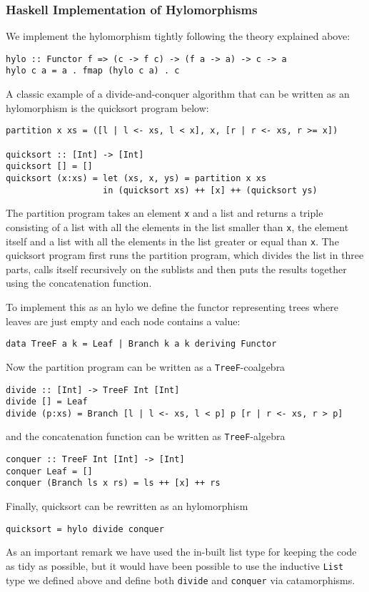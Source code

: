 \documentclass{llncs}
\begin{document}
\subsubsection{Haskell Implementation of Hylomorphisms}
We implement the hylomorphism tightly following the theory explained above:
\begin{verbatim}
hylo :: Functor f => (c -> f c) -> (f a -> a) -> c -> a
hylo c a = a . fmap (hylo c a) . c
\end{verbatim}

A classic example of a divide-and-conquer algorithm that can be written as an hylomorphism is the quicksort program below:

\begin{verbatim}
partition x xs = ([l | l <- xs, l < x], x, [r | r <- xs, r >= x])

quicksort :: [Int] -> [Int]
quicksort [] = []
quicksort (x:xs) = let (xs, x, ys) = partition x xs
                   in (quicksort xs) ++ [x] ++ (quicksort ys)
\end{verbatim}
The partition program takes an element \texttt{x} and a list and returns a triple consisting of a list with all the elements in the list smaller than \texttt{x}, the element itself and a list with all the elements in the list greater or equal than  \texttt{x}. The quicksort program first runs the partition program, which divides the list in three parts, calls itself recursively on the sublists and then puts the results together using the concatenation function.

To implement this as an hylo we define the functor representing trees where leaves are just empty and each node contains a value:
\begin{verbatim}
data TreeF a k = Leaf | Branch k a k deriving Functor
\end{verbatim}
Now the partition program can be written as a  \texttt{TreeF}-coalgebra
\begin{verbatim}
divide :: [Int] -> TreeF Int [Int]
divide [] = Leaf
divide (p:xs) = Branch [l | l <- xs, l < p] p [r | r <- xs, r > p]
\end{verbatim}
and the concatenation function can be written as  \texttt{TreeF}-algebra
\begin{verbatim}
conquer :: TreeF Int [Int] -> [Int]
conquer Leaf = []
conquer (Branch ls x rs) = ls ++ [x] ++ rs
\end{verbatim}
Finally, quicksort can be rewritten as an hylomorphism
\begin{verbatim}
quicksort = hylo divide conquer
\end{verbatim}
As an important remark we have used the in-built list type for keeping the code
as tidy as possible, but it would have been possible to use the inductive
\texttt{List} type we defined above and define both
\texttt{divide} and \texttt{conquer} via
catamorphisms.
\end{document}
